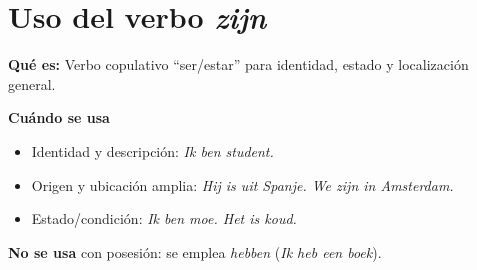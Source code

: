 \section{Uso del verbo \textit{zijn}}
\textbf{Qué es:} Verbo copulativo ``ser/estar'' para identidad, estado y localización general.

\textbf{Cuándo se usa}
\begin{itemize}[leftmargin=*]
  \item Identidad y descripción: \textit{Ik ben student.}
  \item Origen y ubicación amplia: \textit{Hij is uit Spanje. We zijn in Amsterdam.}
  \item Estado/condición: \textit{Ik ben moe. Het is koud.}
\end{itemize}

\textbf{No se usa} con posesión: se emplea \textit{hebben} (\textit{Ik heb een boek}).
